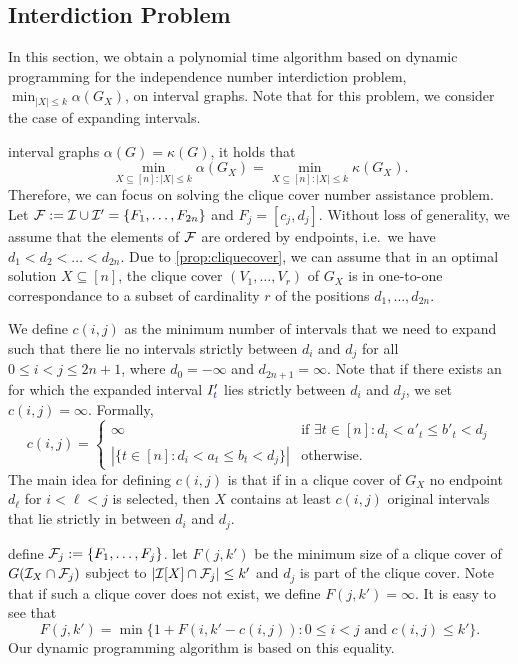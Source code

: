\subsection{Interdiction Problem}
\label{sec:independence-interdiction}
In this section, we obtain a polynomial time algorithm based on dynamic programming for the independence number interdiction problem,  $\min_{|X| \leq k} \alpha(G_X)$,
on interval graphs. Note that for this problem, we consider the case of expanding intervals.

 interval graphs $\alpha(G) = \kappa(G)$, it holds that 
\[ \min_{X \subseteq [n] \colon |X| \leq k } \alpha(G_X) = \min_{X \subseteq [n] \colon |X| \leq k} \kappa(G_X). \]
Therefore, we can focus on solving the clique cover number assistance problem.
Let $\mathcal{F} := \mathcal{I} \cup \mathcal{I}' = \{ F_1, \ldots, F_{2n} \}$ and $F_j = [c_j, d_j]$. Without loss of generality, we assume that the elements of $\mathcal{F}$ are ordered by endpoints, i.e.\ we have $d_1 < d_2 < \dots < d_{2n}$. 
Due to \cref{prop:cliquecover}, we can assume that in an optimal solution $X \subseteq [n]$, the clique cover $(V_1, \dots, V_r)$ of $G_X$ is in one-to-one correspondance to a  subset of cardinality $r$ of the
positions $d_1, \dots, d_{2n}$.

We define $c(i,j)$ 
as the minimum number of intervals that we need to expand such that there lie no 
intervals strictly between $d_i$ and $d_j$ for all $0 \leq i < j \leq 2n+1$, where $d_0=-\infty$ and $d_{2n+1} = \infty$.
Note that if there exists an  for which the expanded interval $I'_{\textcolor{blue}{t}}$ lies strictly between $d_i$ and $d_j$, 
we set $c(i,j) = \infty$. Formally,
\[ c(i,j) = \begin{cases} \infty & \text{if } \exists t \in [n] \colon d_i < a'_t \leq b'_t < d_j\\ |\{ t \in [n] \colon d_i < a_t \leq b_t < d_j \}| & \text{otherwise}. \end{cases} \]
The main idea for defining $c(i,j)$ is that if in a clique cover of $G_X$ no 
endpoint $d_{\ell}$ for $i<\ell<j$ is selected, then $X$ contains at least $c(i,j)$ original intervals that lie strictly in between $d_i$ and $d_j$.

 define $\mathcal{F}_j := \{F_1, \dots, F_j\}$.
 let $F(j,k')$ be the minimum size of a clique cover of $G(\mathcal{I}_X \cap \mathcal{F}_j)$ subject to 
$|\mathcal{I}[X] \cap \mathcal{F}_j| \leq k'$ and $d_j$ is part of the clique cover. Note that if such a clique cover does not exist, 
we define $F(j,k')=\infty$. 
It is easy to see that
    \[ F(j,k') = \min \{ 1 + F(i, k'-c(i,j)) \colon 0 \leq i < j\text{ and } c(i,j) \leq k' \}. \]
Our dynamic programming algorithm is based on this equality.


